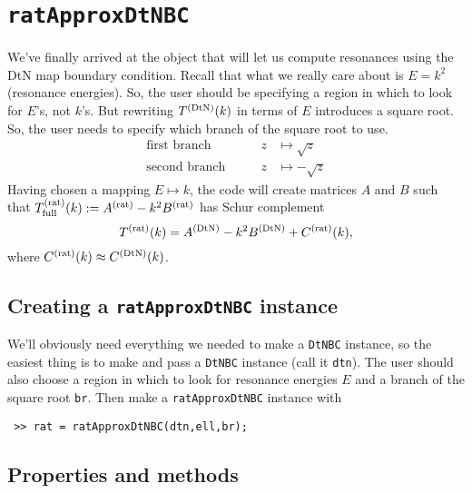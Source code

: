 \section{{\tt ratApproxDtNBC}}
\label{sec-ratApproxDtNBC}

We've finally arrived at the object that will let us
compute resonances using the DtN map boundary condition.
Recall that what we
really care about is $E = k^2$ (resonance energies). So, the
user should be specifying a region in which to look for
$E$'s, not $k$'s. But rewriting $T^{(\text{DtN})}(k)$ in terms of $E$ introduces
a square root. So, the user needs to specify which branch of
the square root to use.
\begin{equation}
\begin{aligned}
 \text{first  branch} &\qquad z &\mapsto  \sqrt{z} \\
 \text{second branch} &\qquad z &\mapsto -\sqrt{z}
\end{aligned}
\end{equation}
Having chosen a mapping $E \mapsto k$, the code will 
create matrices $A$ and $B$ such that
$T^{(\text{rat})}_{\text{full}}(k) := A^{(\text{rat})} - k^2 B^{(\text{rat})}$ has Schur complement
\begin{equation}
 T^{(\text{rat})}(k) = A^{(\text{DtN})} - k^2 B^{(\text{DtN})} + C^{(\text{rat})}(k),
\end{equation}
where $C^{(\text{rat})}(k) \approx C^{(\text{DtN})}(k)$.

\subsection{Creating a {\tt ratApproxDtNBC} instance}

We'll obviously need everything we needed to make a
{\tt DtNBC} instance, so the easiest thing is to make
and pass a {\tt DtNBC} instance (call it {\tt dtn}). 
The user should also choose a region in which to look for
resonance energies $E$ and a branch of the square root
{\tt br}. Then make a {\tt ratApproxDtNBC} instance with
\begin{verbatim}
 >> rat = ratApproxDtNBC(dtn,ell,br);
\end{verbatim}

\subsection{Properties and methods}

